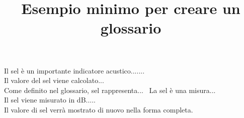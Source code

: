 \documentclass{book}
\title{Esempio minimo per creare un glossario}
\author{}
\date{}
\renewcommand*{\acronymtype}{acronym}
\begin{document}
	\maketitle
	
	
	
	Il \gls{sel} è un importante indicatore acustico.......\\
	Il valore del \gls{sel} viene calcolato...\\
	Come definito nel glossario, \acrfull{sel} rappresenta...\
	La \acrlong{sel} è una misura...\\
	Il \acrshort{sel} viene misurato in dB.....\\
	Il valore di \gls{sel} verrà mostrato di nuovo nella forma completa.\\
	
	\glsaddall
	\printunsrtglossary[type=\acronymtype,style=longgroup,title={Lista delle Abbreviazioni}]
	
\end{document}
